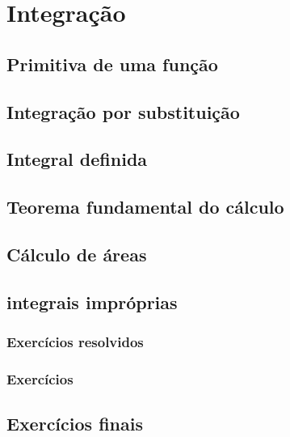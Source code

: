 
\chapter{Integração}\label{cap:integracao}

\emconstrucao

\section{Primitiva de uma função}
\construirSec

\section{Integração por substituição}
\construirSec

\section{Integral definida}
\construirSec

\section{Teorema fundamental do cálculo}
\construirSec

\section{Cálculo de áreas}
\construirSec

\section{integrais impróprias}
\construirSec


\construirSec

\subsection*{Exercícios resolvidos}

\construirExeresol


\subsection*{Exercícios}

\construirExer


\section{Exercícios finais}

\construirExer
